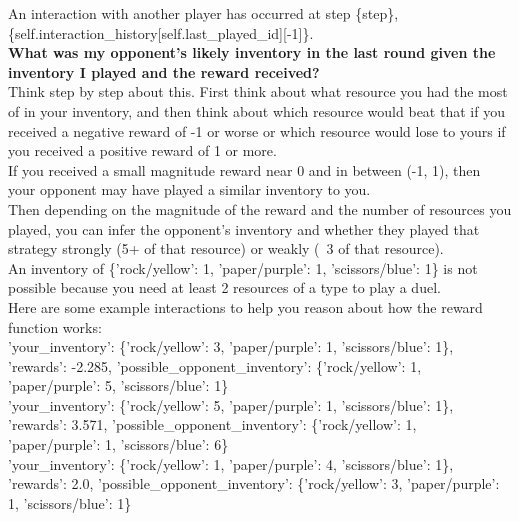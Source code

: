 \documentclass{article} %
\begin{document}
\begin{tcolorbox}[
    title={\small \textbf{ToM Module User Message 1}},
    width=\linewidth, %
    fontupper=\fontsize{9pt}{11pt}\selectfont\ttfamily %
]
An interaction with another player has occurred at step \{step\}, \{self.interaction\_history[self.last\_played\_id][-1]\}.\\
\textbf{What was my opponent's likely inventory in the last round given the inventory I played and the reward received?}\\
Think step by step about this. First think about what resource you had the most of in your inventory, and then think about which resource would beat that if you received a negative reward of -1 or worse or which resource would lose to yours if you received a positive reward of 1 or more.\\
If you received a small magnitude reward near 0 and in between (-1, 1), then your opponent may have played a similar inventory to you.\\
Then depending on the magnitude of the reward and the number of resources you played, you can infer the opponent's inventory and whether they played that strategy strongly (5+ of that resource) or weakly (~3 of that resource).\\
An inventory of \{'rock/yellow': 1, 'paper/purple': 1, 'scissors/blue': 1\} is not possible because you need at least 2 resources of a type to play a duel.\\
Here are some example interactions to help you reason about how the reward function works:\\
'your\_inventory': \{'rock/yellow': 3, 'paper/purple': 1, 'scissors/blue': 1\}, 'rewards': -2.285, 'possible\_opponent\_inventory': \{'rock/yellow': 1, 'paper/purple': 5, 'scissors/blue': 1\}\\
'your\_inventory': \{'rock/yellow': 5, 'paper/purple': 1, 'scissors/blue': 1\}, 'rewards': 3.571, 'possible\_opponent\_inventory': \{'rock/yellow': 1, 'paper/purple': 1, 'scissors/blue': 6\}\\
'your\_inventory': \{'rock/yellow': 1, 'paper/purple': 4, 'scissors/blue': 1\}, 'rewards': 2.0, 'possible\_opponent\_inventory': \{'rock/yellow': 3, 'paper/purple': 1, 'scissors/blue': 1\}\\


\end{tcolorbox}
\end{document}
